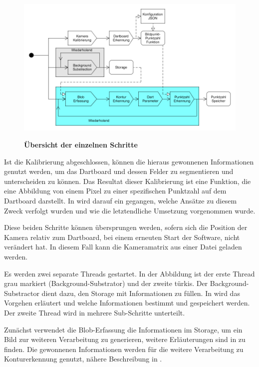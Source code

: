 \begin{figure}[ht]
\includegraphics[width=\textwidth]{media/pipeline.png}\\
\caption{\textbf{Übersicht der einzelnen Schritte}}
\label{Fig:pipeline}
\end{figure}

Ist die Kalibrierung abgeschlossen, können die hieraus gewonnenen Informationen genutzt werden, um das Dartboard und dessen Felder zu segmentieren und unterscheiden zu können. Das Resultat dieser Kalibrierung ist eine Funktion, die eine Abbildung von einem Pixel zu einer spezifischen Punktzahl auf dem Dartboard darstellt. In  wird darauf ein gegangen, welche Ansätze zu diesem Zweck verfolgt wurden und wie die letztendliche Umsetzung vorgenommen wurde.

Diese beiden Schritte können übersprungen werden, sofern sich die Position der Kamera relativ zum Dartboard, bei einem erneuten Start der Software, nicht verändert hat. In diesem Fall kann die Kameramatrix aus einer Datei geladen werden.

Es werden zwei separate Threads gestartet. In der Abbildung ist der erste Thread grau markiert (Background-Substrator) und der zweite türkis. Der Background-Substractor dient dazu, den Storage mit Informationen zu füllen. In  wird das Vorgehen erläutert und welche Informationen bestimmt und gespeichert werden.
Der zweite Thread wird in mehrere Sub-Schritte unterteilt. 

Zunächst verwendet die Blob-Erfassung die Informationen im Storage, um ein Bild zur weiteren Verarbeitung zu generieren, weitere Erläuterungen sind in  zu finden.
Die gewonnenen Informationen werden für die weitere Verarbeitung zu Konturerkennung genutzt, nähere Beschreibung in .

